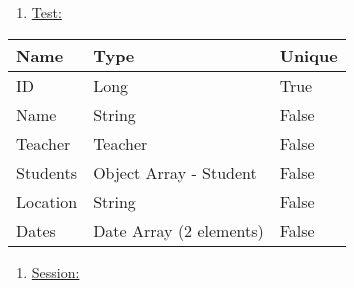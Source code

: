 \documentclass[12pt,a4paper]{article}
\begin{document}
    \begin{enumerate}
        \setcounter{enumi}{\thenumberedCntBA}

        \newpage

        \item \underline{Test:}
        \setcounter{numberedCntBA}{\theenumi}
    \end{enumerate}
    \begin{table}[h]
        \centering
        \begin{tabular}{|l|l|l|}
            \hline
            \textbf{Name} & \textbf{Type} & \textbf{Unique} \\
            \hline
            ID & Long & True \\
            \hline
            Name & String & False \\
            \hline
            Teacher & Teacher & False \\
            \hline
            Students & Object Array - Student & False \\
            \hline
            Location & String & False \\
            \hline
            Dates & Date Array (2 elements) & False \\
            \hline
        \end{tabular}
    \end{table}


    \newpage

    \begin{enumerate}
        \setcounter{enumi}{\thenumberedCntBA}
        \item \underline{Session:}
        \setcounter{numberedCntBA}{\theenumi}
    \end{enumerate}
\end{document}
